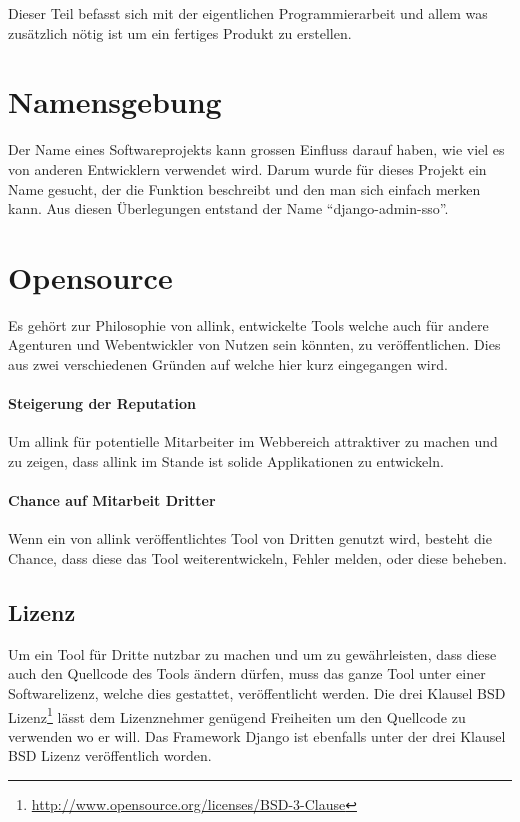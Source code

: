 Dieser Teil befasst sich mit der eigentlichen Programmierarbeit und allem was zusätzlich nötig ist um ein fertiges Produkt zu erstellen.

\section{Namensgebung}
\label{sec:namensgebung}
Der Name eines Softwareprojekts kann grossen Einfluss darauf haben, wie viel es von anderen Entwicklern verwendet wird. Darum wurde für dieses Projekt ein Name gesucht, der die Funktion beschreibt und den man sich einfach merken kann. Aus diesen Überlegungen entstand der Name ``django-admin-sso''.

\section{Opensource}
\label{sec:opensource}
Es gehört zur Philosophie von allink, entwickelte Tools welche auch für andere Agenturen und Webentwickler von Nutzen sein könnten, zu veröffentlichen. Dies aus zwei verschiedenen Gründen auf welche hier kurz eingegangen wird.

\paragraph{Steigerung der Reputation}
\label{par:steigerung_der_reputation}
Um allink für potentielle Mitarbeiter im Webbereich attraktiver zu machen und zu zeigen, dass allink im Stande ist solide Applikationen zu entwickeln.
\paragraph{Chance auf Mitarbeit Dritter}
\label{par:chance_auf_mitarbeit_dritter}
Wenn ein von allink veröffentlichtes Tool von Dritten genutzt wird, besteht die Chance, dass diese das Tool weiterentwickeln, Fehler melden, oder diese beheben.

\subsection{Lizenz}
\label{sub:lizenz}
Um ein Tool für Dritte nutzbar zu machen und um zu gewährleisten, dass diese auch den Quellcode des Tools ändern dürfen, muss das ganze Tool unter einer Softwarelizenz, welche dies gestattet, veröffentlicht werden. Die drei Klausel BSD Lizenz\footnote{\url{http://www.opensource.org/licenses/BSD-3-Clause}} lässt dem Lizenznehmer genügend Freiheiten um den Quellcode zu verwenden wo er will. Das Framework Django ist ebenfalls unter der drei Klausel BSD Lizenz veröffentlich worden.

